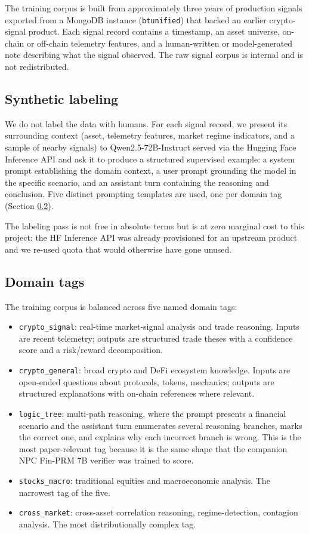 \documentclass[10pt,letterpaper]{article}
\begin{document}
The training corpus is built from approximately three years of production signals exported from a MongoDB instance (\texttt{btunified}) that backed an earlier crypto-signal product. Each signal record contains a timestamp, an asset universe, on-chain or off-chain telemetry features, and a human-written or model-generated note describing what the signal observed. The raw signal corpus is internal and is not redistributed.

\subsection{Synthetic labeling}

We do not label the data with humans. For each signal record, we present its surrounding context (asset, telemetry features, market regime indicators, and a sample of nearby signals) to Qwen2.5-72B-Instruct served via the Hugging Face Inference API and ask it to produce a structured supervised example: a system prompt establishing the domain context, a user prompt grounding the model in the specific scenario, and an assistant turn containing the reasoning and conclusion. Five distinct prompting templates are used, one per domain tag (Section \ref{sec:tags}).

The labeling pass is not free in absolute terms but is at zero marginal cost to this project: the HF Inference API was already provisioned for an upstream product and we re-used quota that would otherwise have gone unused.

\subsection{Domain tags}
\label{sec:tags}

The training corpus is balanced across five named domain tags:

\begin{itemize}[leftmargin=*,itemsep=0pt]
\item \texttt{crypto\_signal}: real-time market-signal analysis and trade reasoning. Inputs are recent telemetry; outputs are structured trade theses with a confidence score and a risk/reward decomposition.
\item \texttt{crypto\_general}: broad crypto and DeFi ecosystem knowledge. Inputs are open-ended questions about protocols, tokens, mechanics; outputs are structured explanations with on-chain references where relevant.
\item \texttt{logic\_tree}: multi-path reasoning, where the prompt presents a financial scenario and the assistant turn enumerates several reasoning branches, marks the correct one, and explains why each incorrect branch is wrong. This is the most paper-relevant tag because it is the same shape that the companion NPC Fin-PRM 7B \cite{bachu2026cheapprms} verifier was trained to score.
\item \texttt{stocks\_macro}: traditional equities and macroeconomic analysis. The narrowest tag of the five.
\item \texttt{cross\_market}: cross-asset correlation reasoning, regime-detection, contagion analysis. The most distributionally complex tag.
\end{itemize}
\end{document}
